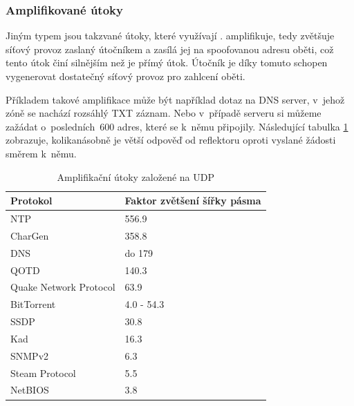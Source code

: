 \subsubsection{Amplifikované útoky}
Jiným typem jsou takzvané  útoky, které využívají .
 amplifikuje, tedy zvětšuje síťový provoz zaslaný útočníkem a zasílá jej na
spoofovanou  adresu oběti, což tento útok činí silnějším než je přímý útok. Útočník je díky
tomuto schopen vygenerovat dostatečný síťový provoz pro zahlcení oběti.

Příkladem takové amplifikace může být například dotaz na DNS server, v~jehož zóně se nachází
rozsáhlý TXT záznam. Nebo v~případě  serveru si můžeme zažádat
o~posledních~600
adres, které se k~němu připojily. Následující tabulka \ref{tab:udp_ampl} zobrazuje,
kolikanásobně je větší odpověď od reflektoru oproti vyslané žádosti směrem k~němu.

\begin{table}[]
	\centering
	\caption{Amplifikační útoky založené na UDP \cite{TA14-017A}}
	\label{tab:udp_ampl}
	\begin{tabular}{|l|l|}
		\hline
		Protokol               & Faktor zvětšení šířky pásma    \\ \hline
		NTP                    & 556.9                          \\ \hline
		CharGen                & 358.8                          \\ \hline
		DNS                    & do 179                         \\ \hline
		QOTD                   & 140.3                          \\ \hline
		Quake Network Protocol & 63.9                           \\ \hline
		BitTorrent             & 4.0 - 54.3                     \\ \hline
		SSDP                   & 30.8                           \\ \hline
		Kad                    & 16.3                           \\ \hline
		SNMPv2                 & 6.3                            \\ \hline
		Steam Protocol         & 5.5                            \\ \hline
		NetBIOS                & 3.8                            \\ \hline
	\end{tabular}
\end{table}

